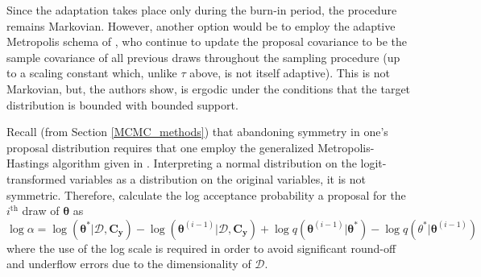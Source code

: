 \documentclass{article}
\begin{document}

Since the adaptation takes place only during the burn-in period, the procedure remains Markovian. However, another option would be to employ the adaptive Metropolis schema of \cite{Haario2001,Haario2005,Haario2006}, who continue to update the proposal covariance to be the sample covariance of all previous draws throughout the sampling procedure (up to a scaling constant which, unlike $\tau$ above, is not itself adaptive). This is not Markovian, but, the authors show, is ergodic under the conditions that the target distribution is bounded with bounded support. 

Recall (from Section \ref{MCMC_methods}) that abandoning symmetry in one's proposal distribution requires that one employ the generalized Metropolis-Hastings algorithm given in \cite{Hastings1970}. Interpreting a normal distribution on the logit-transformed variables as a distribution on the original variables, it is not symmetric. Therefore, calculate the log acceptance probability a proposal for the $i^{\text{th}}$ draw of $\boldsymbol \theta$ as 
\begin{equation}
\log \alpha = \log(\boldsymbol \theta^*|\mathcal D, \mathbf C_{\mathbf y}) - \log(\boldsymbol \theta^{(i-1)}|\mathcal D,\mathbf C_{\mathbf y}) + \log q(\boldsymbol \theta^{(i-1)}|\boldsymbol \theta^*)
- \log q(\theta^* |\boldsymbol \theta^{(i-1)})
\end{equation}
where the use of the log scale is required in order to avoid significant round-off and underflow errors due to the dimensionality of $\mathcal D$.
\end{document}

